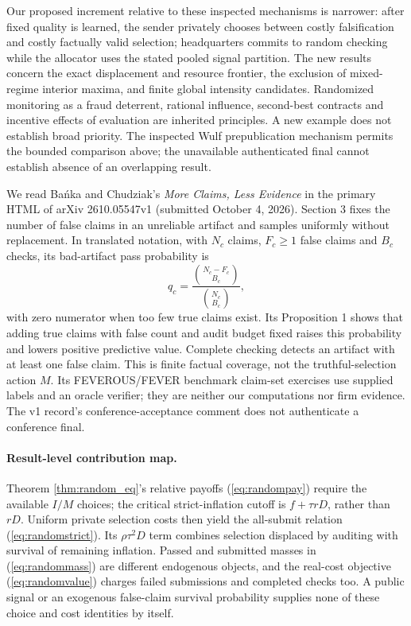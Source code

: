 \documentclass[11pt]{article}
\begin{document}
Our proposed increment relative to these inspected mechanisms is narrower: after fixed quality is learned, the sender privately chooses between costly falsification and costly factually valid selection; headquarters commits to random checking while the allocator uses the stated pooled signal partition. The new results concern the exact displacement and resource frontier, the exclusion of mixed-regime interior maxima, and finite global intensity candidates. Randomized monitoring as a fraud deterrent, rational influence, second-best contracts and incentive effects of evaluation are inherited principles. A new example does not establish broad priority. The inspected Wulf prepublication mechanism permits the bounded comparison above; the unavailable authenticated final cannot establish absence of an overlapping result.

We read Ba\'nka and Chudziak's \emph{More Claims, Less Evidence} in the primary HTML of arXiv 2610.05547v1 (submitted October 4, 2026). Section 3 fixes the number of false claims in an unreliable artifact and samples uniformly without replacement. In translated notation, with $N_c$ claims, $F_c\geq1$ false claims and $B_c$ checks, its bad-artifact pass probability is
\[
q_c=\frac{\binom{N_c-F_c}{B_c}}{\binom{N_c}{B_c}},
\]
with zero numerator when too few true claims exist. Its Proposition 1 shows that adding true claims with false count and audit budget fixed raises this probability and lowers positive predictive value. Complete checking detects an artifact with at least one false claim. This is finite factual coverage, not the truthful-selection action $M$. Its FEVEROUS/FEVER benchmark claim-set exercises use supplied labels and an oracle verifier; they are neither our computations nor firm evidence. The v1 record's conference-acceptance comment does not authenticate a conference final.

\paragraph{Result-level contribution map.}
Theorem \ref{thm:random_eq}'s relative payoffs (\ref{eq:randompay}) require the available $I/M$ choices; the critical strict-inflation cutoff is $f+\tau rD$, rather than $rD$. Uniform private selection costs then yield the all-submit relation (\ref{eq:randomstrict}). Its $\rho\tau^2D$ term combines selection displaced by auditing with survival of remaining inflation. Passed and submitted masses in (\ref{eq:randommass}) are different endogenous objects, and the real-cost objective (\ref{eq:randomvalue}) charges failed submissions and completed checks too. A public signal or an exogenous false-claim survival probability supplies none of these choice and cost identities by itself.
\end{document}
